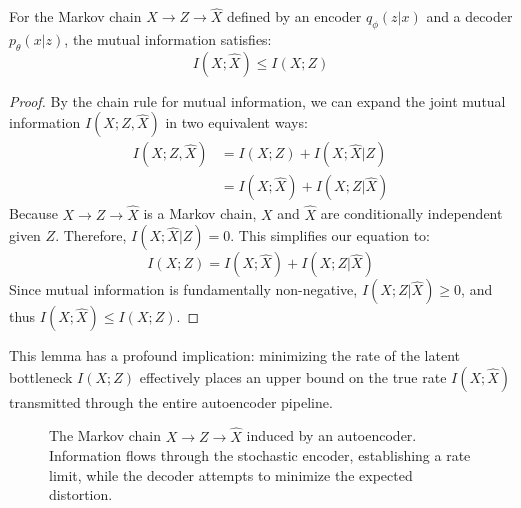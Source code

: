 \begin{lemma}
For the Markov chain $X \to Z \to \hat{X}$ defined by an encoder $q_\phi(z|x)$ and a decoder $p_\theta(x|z)$, the mutual information satisfies:
\begin{equation}
    I(X; \hat{X}) \le I(X; Z)
\end{equation}
\end{lemma}
\begin{proof}
By the chain rule for mutual information, we can expand the joint mutual information $I(X; Z, \hat{X})$ in two equivalent ways:
\begin{align*}
    I(X; Z, \hat{X}) &= I(X; Z) + I(X; \hat{X} | Z) \\
    &= I(X; \hat{X}) + I(X; Z | \hat{X})
\end{align*}
Because $X \to Z \to \hat{X}$ is a Markov chain, $X$ and $\hat{X}$ are conditionally independent given $Z$. Therefore, $I(X; \hat{X} | Z) = 0$. This simplifies our equation to:
\begin{equation*}
    I(X; Z) = I(X; \hat{X}) + I(X; Z | \hat{X})
\end{equation*}
Since mutual information is fundamentally non-negative, $I(X; Z | \hat{X}) \ge 0$, and thus $I(X; \hat{X}) \le I(X; Z)$.
\end{proof}

This lemma has a profound implication: minimizing the rate of the latent bottleneck $I(X;Z)$ effectively places an upper bound on the true rate $I(X; \hat{X})$ transmitted through the entire autoencoder pipeline. 

\begin{figure}[htbp]
\centering
{}
\caption{The Markov chain $X \to Z \to \hat{X}$ induced by an autoencoder. Information flows through the stochastic encoder, establishing a rate limit, while the decoder attempts to minimize the expected distortion.}
\label{fig:rd_markov}
\end{figure}

